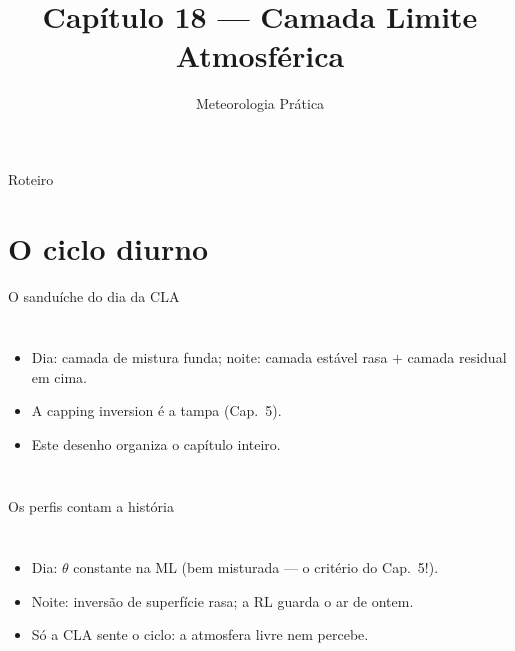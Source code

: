 \documentclass[aspectratio=169,11pt]{beamer}
\title[Cap. 18 --- Camada Limite]{Capítulo 18 --- Camada Limite
Atmosférica}
\subtitle{Meteorologia Prática}
\author{}
\date{}
\begin{document}
\begin{frame}
  \titlepage
  \vfill
  \atribuicao
\end{frame}

\begin{frame}{Roteiro}
  \tableofcontents
\end{frame}

\section{O ciclo diurno}

\begin{frame}{O sanduíche do dia da CLA}
  \begin{columns}
    \begin{itemize}
      \item Dia: camada de \alert{mistura} funda; noite: camada
            \alert{estável} rasa $+$ camada \alert{residual} em cima.
      \item A capping inversion é a tampa (Cap.~5).
      \item Este desenho organiza o capítulo inteiro.
    \end{itemize}
  \end{columns}
\end{frame}

\begin{frame}{Os perfis contam a história}
  \begin{columns}
    \begin{itemize}
      \item Dia: $\theta$ constante na ML (bem misturada — o
            critério do Cap.~5!).
      \item Noite: inversão de superfície rasa; a RL guarda o ar de
            ontem.
      \item Só a CLA sente o ciclo: a atmosfera livre nem percebe.
    \end{itemize}
  \end{columns}
\end{frame}
\end{document}
